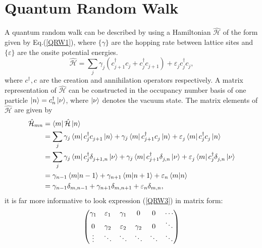 \documentclass{article}
\numberwithin{equation}{section}
\renewcommand{\H}{\mathcal{\hat{H}}} %
\newcommand{\1}{\mathbb{1}}
\newcommand{\annihilation}{c^{}}
\newcommand{\creation}{c^{\dagger}}
\begin{document}
\section{Quantum Random Walk}
A quantum random walk can be described by using a Hamiltonian $\H$ of the form given by Eq.(\ref{QRW1}), where $\{\gamma\}$ are the hopping rate between lattice sites and $\{\varepsilon\}$ are the onsite potential energies.
\begin{equation}\label{QRW1}
    \H=\sum_{j}\gamma^{}_j(\creation_{j+1}\annihilation_j+\creation_{j}\annihilation_{j+1})+\varepsilon^{}_j\creation_j\annihilation_j,
\end{equation}
where $\creation,\annihilation$ are the creation and annihilation operators respectively.
A matrix representation of $\H$ can be constructed in the occupancy number basis of one particle $\ket{n}=\creation_n\ket{\nu}$, where $\ket{\nu}$ denotes the vacuum state. The matrix elements of $\H$ are given by
\begin{align}\label{QRW2}
    \H_{mn}&=\bra{m}\H\ket{n}   
    \\
    &=\sum_j \gamma_j\bra{m}\creation_{j}\annihilation_{j+1}\ket{n} +\gamma_j\bra{m}\creation_{j+1}\annihilation_{j}\ket{n} + \varepsilon^{}_j\bra{m}\creation_{j}\annihilation_{j}\ket{n} 
    \\
    &= \sum_j \gamma_j\bra{m}\creation_{j}\delta^{}_{j+1,n}\ket{\nu}
    +\gamma_j\bra{m}\creation_{j+1}\delta^{}_{j,n}\ket{\nu} +
    \varepsilon^{}_j\bra{m}\creation_{j}\delta^{}_{j,n}\ket{\nu} 
    \\
    &= \gamma_{n-1}\bra{m}\ket{n-1}+\gamma_{n+1}\bra{m}\ket{n+1}+\varepsilon_n\bra{m}\ket{n}
    \\
    &=\gamma_{n-1}\delta_{m,n-1}+\gamma_{n+1}\delta_{m,n+1}+\varepsilon_n\delta_{m,n}, \label{QRW3}
\end{align}
it is far more informative to look expression (\ref{QRW3}) in matrix form:
\begin{equation}
    \mqty(
    \gamma_1 & \varepsilon_1 & \gamma_1 & 0 & 0 &\cdots 
    \\
    0 & \gamma_2 & \varepsilon_2 & \gamma_2 & 0&\ddots
    \\
    \vdots & \ddots & \ddots & \ddots  & \ddots &\ddots
    )
\end{equation}
\end{document}
